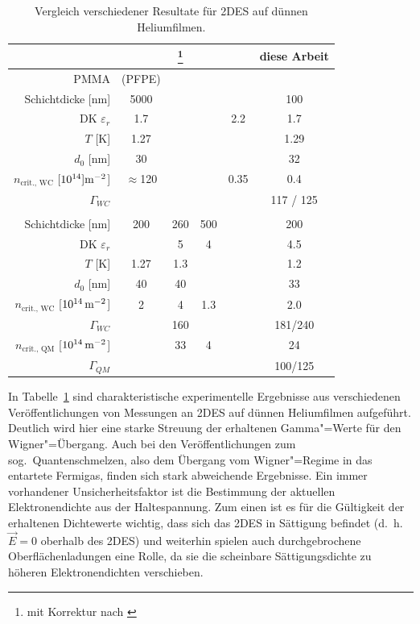 \begin{table}[h!tp]
\begin{minipage}{0.98\textwidth}
\small
\begin{center}
\begin{tabular}{|r|c|c|c|c|c|}\hline
				& \cite{neser}& \cite{guenzler}\footnote{mit Korrektur nach \cite{bitnar}} & \cite{Gue96} & \cite{Mis97} & diese Arbeit\\\hline\hline
PMMA							& (PFPE)	& & & & \\\hline
Schichtdicke	 [nm]		& 5000	& & & & 100	\\
DK $\varepsilon_r$	& 1.7	&	&	& 2.2	& 1.7	\\
$T$ [K]				& 1.27	& & & & 1.29 \\
$d_0$ [nm]	& 30	& & & & 32 \\\hline
$n_\text{crit., WC}$ [$10^{14}]{\ensuremath{\text{\upshape m}^{-2}}}$]	
										&	$\approx$120&	&	& 0.35	& 0.4 \\
$\Gamma_{WC}$	&	&	&	&	& 117 / 125	\\\hline\hline
\SiO								&	&	&	&	&	\\\hline
Schichtdicke	 [nm]		&	200 & 260	& 500	&	& 200	\\
DK $\varepsilon_r$	&	& 5 & 4 & & 4.5	\\
$T$ [K]				&	1.27 & 1.3 & & & 1.2	\\
$d_0$ [nm]	&	40 & 40 & & & 33		\\\hline
$n_\text{crit., WC}$ [$\unit[10^{14}]{\Em}$]
										&	2 & 4	& 1.3	&	& 2.0		\\
$\Gamma_{WC}$	&	& 160& & & 181/240	\\\hline
$n_\text{crit., QM}$ [$\unit[10^{14}]{\Em}$]
										&	& 33	& 4	& & 24	\\
$\Gamma_{QM}$	&	&	&	&	&	100/125	\\\hline
\end{tabular}
\end{center}
\end{minipage}
\caption{Vergleich verschiedener Resultate für 2DES auf dünnen Heliumfilmen.}
\label{tab:compare}
\end{table}

In Tabelle~\ref{tab:compare} sind charakteristische experimentelle Ergebnisse aus verschiedenen Veröffentlichungen von Messungen an 2DES auf dünnen Heliumfilmen aufgeführt. Deutlich wird hier eine starke Streuung der erhaltenen Gamma"=Werte für den Wigner"=Übergang. Auch bei den Veröffentlichungen \cite{guenzler,Gue96} zum sog.\ Quantenschmelzen, also dem Übergang vom Wigner"=Regime in das entartete Fermigas, finden sich stark abweichende Ergebnisse. Ein immer vorhandener Unsicherheitsfaktor ist die Bestimmung der aktuellen Elektronendichte aus der Haltespannung. Zum einen ist es für die Gültigkeit der erhaltenen Dichtewerte wichtig, dass sich das 2DES in Sättigung befindet (d.~h.\ $\vec E=0$ oberhalb des 2DES) und weiterhin spielen auch durchgebrochene Oberflächenladungen eine Rolle, da sie die scheinbare Sättigungsdichte zu höheren Elektronendichten verschieben.

